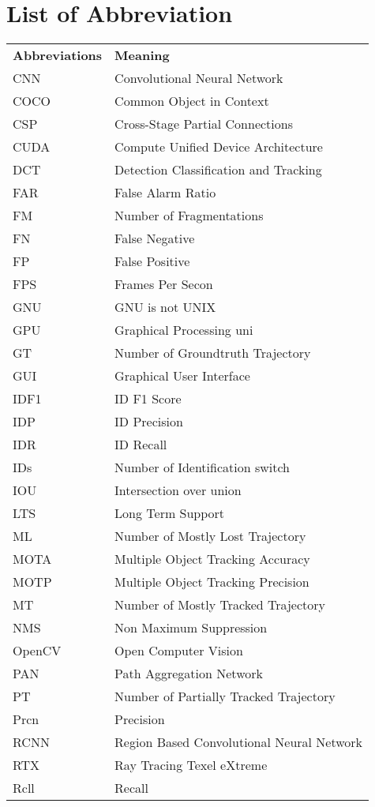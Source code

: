 				\chapter*{List of Abbreviation}
			\endgroup
		    \normalsize
			\begin{table}[h]
				\begin{center}
					\begin{tabular}{l l}
						\textbf{Abbreviations} & \textbf{Meaning} \\
						CNN & Convolutional Neural Network\\
						COCO & Common Object in Context \\
						CSP & Cross-Stage Partial Connections \\
						CUDA & Compute Unified Device Architecture \\
						DCT & Detection Classification and Tracking \\
						FAR & False Alarm Ratio \\
						FM & Number of Fragmentations \\
						FN & False Negative \\
						FP & False Positive \\
						FPS & Frames Per Secon \\
						GNU & GNU is not UNIX \\
						GPU & Graphical Processing uni \\
						GT & Number of Groundtruth Trajectory \\
						GUI & Graphical User Interface \\
						IDF1 & ID F1 Score\\
						IDP & ID Precision \\
						IDR & ID Recall\\
						IDs & Number of Identification switch \\
						IOU & Intersection over union \\
						LTS & Long Term Support \\
						ML & Number of Mostly Lost Trajectory \\
						MOTA & Multiple Object Tracking Accuracy \\
						MOTP & Multiple Object Tracking Precision \\
						MT & Number of Mostly Tracked Trajectory \\
						NMS & Non Maximum Suppression \\
						OpenCV & Open Computer Vision \\
						PAN & Path Aggregation Network \\
						PT & Number of Partially Tracked Trajectory \\
						Prcn & Precision \\
						RCNN & Region Based Convolutional Neural Network \\
						RTX & Ray Tracing Texel eXtreme \\
						Rcll & Recall \\
					\end{tabular}
				\end{center}
			\end{table}

